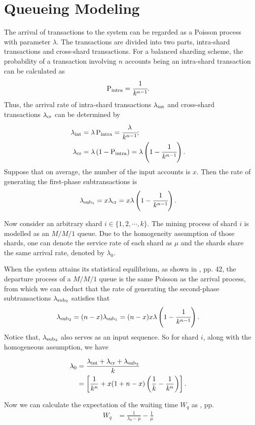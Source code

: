 
\section*{Queueing Modeling}

The arrival of transactions to the system can be regarded as a Poisson process with parameter \(\lambda\). 
The transactions are divided into two parts, intra-shard transactions and cross-shard transactions. 
For a balanced sharding scheme, the probability of a transaction involving $n$ accounts being an intra-shard transaction can be calculated as 
\[\operatorname{P}_{\rm intra} = \cfrac{1}{k^{n-1}}.\]
Thus, the arrival rate of intra-shard transactions \(\lambda_{\rm int}\) and cross-shard transactions \(\lambda_{\rm cr}\)
can be determined by 
\begin{align*}
    \lambda_{\rm int} &= \lambda \operatorname{P}_{\rm intra} = \cfrac{\lambda}{k^{n-1}}; \\
    \lambda_{\rm cr} &= \lambda \left(1- \operatorname{P}_{\rm intra}\right) = \lambda\left(1-\cfrac{1}{k^{n-1}}\right).
\end{align*}
Suppose that on average, the number of the input accounts is $x$. Then the rate of generating the first-phase subtransactions is
\[\lambda_{\rm sub_1} = x \lambda_{\rm cr} = x \lambda\left(1-\cfrac{1}{k^{n-1}}\right).\]

Now consider an arbitrary shard $i \in \{1,2,\cdots ,k\}$. 
The mining process of shard $i$ is modelled as an $M/M/1$ queue.
Due to the homogeneity assumption of those shards, one can denote the service rate of each shard as $\mu$ and 
the shards share the same arrival rate, denoted by $\lambda_0$.

When the system attains its statistical equilibrium, as shown in \cite{bhat2008IntroductionQueueingTheory}, pp. 42, the
departure process of a $M/M/1$ queue is the same Poisson as the arrival process, from which we can deduct that
the rate of generating the second-phase subtransactions $\lambda_{\rm sub_2}$ satisfies that
\[\lambda_{\rm sub_2} = (n-x) \lambda_{\rm sub_1} = (n-x)x \lambda\left(1-\cfrac{1}{k^{n-1}}\right).\]
Notice that, $\lambda_{\rm sub_2}$ also serves as an input sequence. 
So for shard $i$, along with the homogeneous assumption, we have 

\begin{align*}
    \lambda_0 &= \frac{\lambda_{\rm int} + \lambda_{\rm cr}+ \lambda_{\rm sub_2}}{k} \\ &= \left[\frac{1}{k^n}+x(1+n-x)\left(\frac{1}{k}-\frac{1}{k^n}\right)\right].
\end{align*}

Now we can calculate the expectation of the waiting time $W_q$ as \cite{bhat2008IntroductionQueueingTheory}, pp.
\begin{align*}
    W_q &= \frac{1}{\lambda_0 - \mu } - \frac{1}{\mu} \\ 
\end{align*}